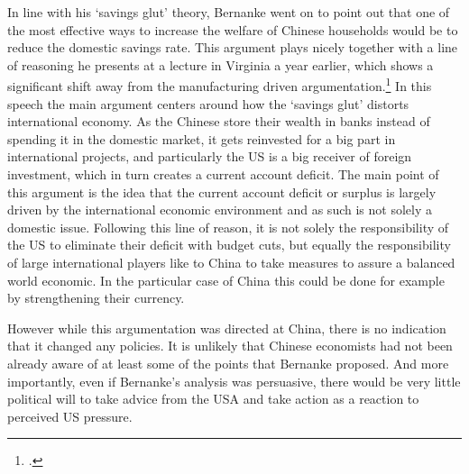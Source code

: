 In line with his `savings glut' theory, Bernanke went on to point out 
that one of the most effective ways to increase the welfare of Chinese 
households would be to reduce the domestic savings rate. This argument 
plays nicely together with a line of reasoning he presents at a lecture 
in Virginia a year earlier, which shows a significant shift away from 
the manufacturing driven argumentation.\footnote{\cite{Bernanke05}.} In this speech the main argument centers 
around how the `savings glut' distorts international economy.  As the 
Chinese store their wealth in banks instead of spending it in the 
domestic market, it gets reinvested for a big part in international 
projects, and particularly the US is a big receiver of foreign 
investment, which in turn creates a current account deficit.  The main 
point of this argument is the idea that the current account deficit or 
surplus is largely driven by the international economic environment and 
as such is not solely a domestic issue. Following this line of reason, 
it is not solely the responsibility of the US to eliminate their deficit 
with budget cuts, but equally the responsibility of large international 
players like to China to take measures to assure a balanced world 
economic. In the particular case of China this could be done for example 
by strengthening their currency.

However while this argumentation was directed at China, there is no 
indication that it changed any policies. It is unlikely that Chinese 
economists had not been already aware of at least some of the points that 
Bernanke proposed. And more importantly, even if Bernanke's analysis was persuasive, there would be very little 
political will to take advice from the USA and take action as a reaction to perceived US pressure.

